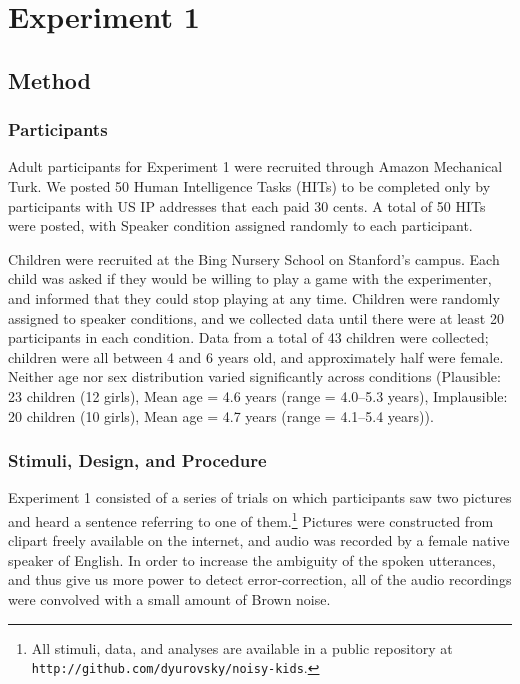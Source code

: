 \documentclass[man,floatsintext]{apa6}
\begin{document}
\section{Experiment 1}

\subsection{Method}
\subsubsection{Participants}

Adult participants for Experiment 1 were recruited through Amazon Mechanical Turk. We posted 50 Human Intelligence Tasks (HITs) to be completed only by participants with US IP addresses that each paid 30 cents. A total of 50 HITs were posted, with Speaker condition assigned randomly to each participant.

Children were recruited at the Bing Nursery School on Stanford's campus. Each child was asked if they would be willing to play a game with the experimenter, and informed that they could stop playing at any time. Children were randomly assigned to speaker conditions, and we collected data until there were at least 20 participants in each condition. Data from a total of 43 children were collected; children were all between 4 and 6 years old, and approximately half were female. Neither age nor sex distribution varied significantly across conditions (Plausible: 23 children (12 girls), Mean age = 4.6 years (range = 4.0--5.3 years), Implausible: 20 children (10 girls), Mean age = 4.7 years (range = 4.1--5.4 years)).

\subsubsection{Stimuli, Design, and Procedure}

Experiment 1 consisted of a series of trials on which participants saw two pictures and heard a sentence referring to one of them.\footnote{All stimuli, data, and analyses are available in a public repository at \small{\tt{http://github.com/dyurovsky/noisy-kids}}.} Pictures were constructed from clipart freely available on the internet, and audio was recorded by a female native speaker of English. In order to increase the ambiguity of the spoken utterances, and thus give us more power to detect error-correction, all of the audio recordings were convolved with a small amount of Brown noise.
\end{document}
